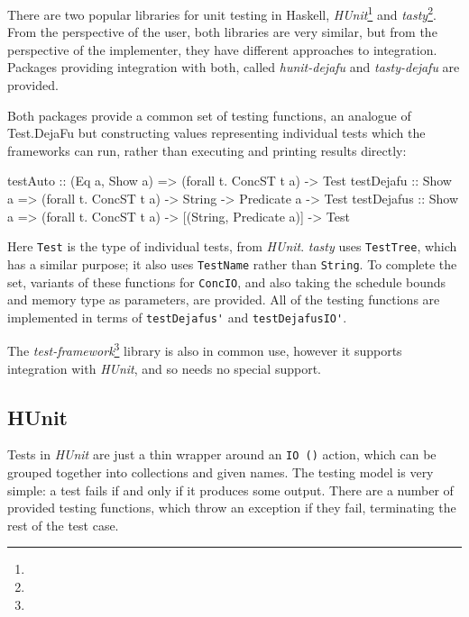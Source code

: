 There are two popular libraries for unit testing in Haskell,
\emph{HUnit}\footnote{} and
\emph{tasty}\footnote{}. From the perspective of the
user, both libraries are very similar, but from the perspective of the
implementer, they have different approaches to integration. Packages
providing integration with both, called \emph{hunit-dejafu} and
\emph{tasty-dejafu} are provided.

Both packages provide a common set of testing functions, an analogue
of Test.\-DejaFu but constructing values representing individual tests
which the frameworks can run, rather than executing and printing
results directly:

\begin{haskellcode}
testAuto    :: (Eq a, Show a) => (forall t. ConcST t a) -> Test
testDejafu  :: Show a => (forall t. ConcST t a) -> String -> Predicate a -> Test
testDejafus :: Show a => (forall t. ConcST t a) -> [(String, Predicate a)] -> Test
\end{haskellcode}

Here \verb|Test| is the type of individual tests, from
\emph{HUnit}. \emph{tasty} uses \verb|TestTree|, which has a similar
purpose; it also uses \verb|TestName| rather than \verb|String|. To
complete the set, variants of these functions for \verb|ConcIO|, and
also taking the schedule bounds and memory type as parameters, are
provided. All of the testing functions are implemented in terms of
\verb|testDejafus'| and \verb|testDejafusIO'|.

The \emph{test-framework}\footnote{} library
is also in common use, however it supports integration with
\emph{HUnit}, and so needs no special support.

\subsection{HUnit}
\label{sec:practice-integration-hunit}

Tests in \emph{HUnit} are just a thin wrapper around an \verb|IO ()|
action, which can be grouped together into collections and given
names. The testing model is very simple: a test fails if and only if
it produces some output. There are a number of provided testing
functions, which throw an exception if they fail, terminating the rest
of the test case.


